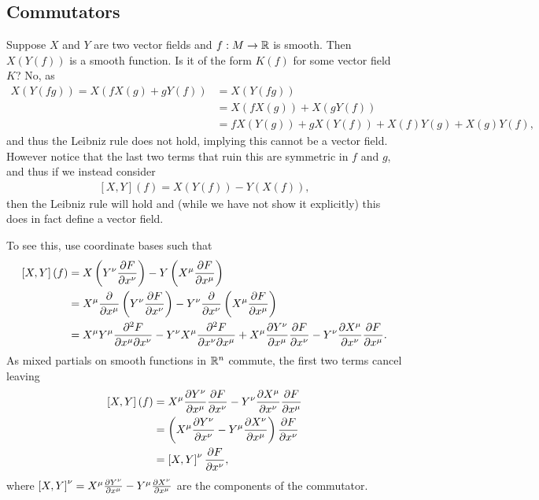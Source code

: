 \subsection{Commutators}

Suppose $X$ and $Y$ are two vector fields and $f : M \to \mathbb{R}$ is smooth. Then $X \left( Y \left( f \right)  \right) $ is a smooth function. Is it of the form $K \left( f \right) $ for some vector field $K$? No, as
\begin{align}
    X \left( Y \left( fg \right)  \right) = X \left( f X \left( g \right) + g Y \left( f \right)  \right) &= X \left( Y \left( fg \right)  \right) \\
    &= X \left( f X \left( g \right) \right) + X \left(g Y \left( f \right)  \right) \\
    &= f X \left( Y \left( g \right)  \right) + g X \left( Y \left( f \right)  \right) + X\left( f \right) Y \left( g \right) + X \left( g \right) Y \left( f \right) 
,\end{align}
and thus the Leibniz rule does not hold, implying this cannot be a vector field. However notice that the last two terms that ruin this are symmetric in $f$ and $g$, and thus if we instead consider
\begin{align}
    \left[ X, Y \right] \left( f \right) = X \left( Y \left( f \right)  \right) - Y \left( X \left( f \right)  \right) 
,\end{align}
then the Leibniz rule will hold and (while we have not show it explicitly) this does in fact define a vector field.


To see this, use coordinate bases such that
\begin{align}
    \left[ X, Y \right] \left( f \right) &= X \left( Y^{\nu} \pdv{F}{x^{\nu}} \right) - Y \left( X^{\mu} \pdv{F}{x^{\mu}} \right)  \\
    &= X^{\mu} \pdv{x^{\mu}} \left( Y^{\nu} \pdv{F}{x^{\nu}} \right) - Y^{\nu} \pdv{x^{\nu}} \left( X^{\mu} \pdv{F}{x^{\mu}} \right)   \\
    &= X^{\mu} Y^{\mu} \pdv[2]{F}{x^{\mu}}{x^{\nu}} - Y^{\nu} X^{\mu} \pdv[2]{F}{x^{\nu}}{x^{\mu}} + X^{\mu} \pdv{Y^{\nu}}{x^{\mu}} \pdv{F}{x^{\nu}} - Y^{\nu} \pdv{X^{\mu}}{x^{\nu}} \pdv{F}{x^{\mu}}
.\end{align}
As mixed partials on smooth functions in $\mathbb{R}^{n}$ commute, the first two terms cancel leaving
\begin{align}
    \left[ X, Y \right] \left( f \right) &= X^{\mu} \pdv{Y^{\nu}}{x^{\mu}} \pdv{F}{x^{\nu}} - Y^{\nu} \pdv{X^{\mu}}{x^{\nu}} \pdv{F}{x^{\mu}}\\
    &= \left( X^{\mu} \pdv{Y^{\nu}}{x^{\nu}} - Y^{\mu} \pdv{X^{\nu}}{x^{\mu}}\right) \pdv{F}{x^{\nu}} \\
    &= \left[ X, Y \right]^{\nu} \pdv{F}{x^{\nu}}
,\end{align}
where $\left[ X, Y \right]^{\nu} = X^{\mu} \pdv{Y^{\nu}}{x^{\mu}} - Y^{\mu} \pdv{X^{\nu}}{x^{\mu}}$ are the components of the commutator.

